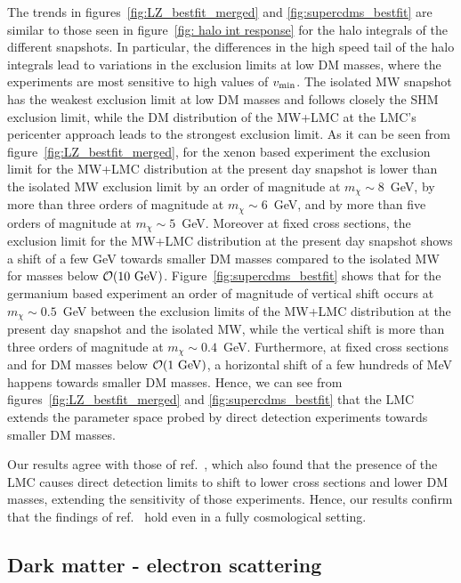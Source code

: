 The trends in figures~\ref{fig:LZ_bestfit_merged} and \ref{fig:supercdms_bestfit} are similar to those seen in figure~\ref{fig: halo int response} for the halo integrals of the different snapshots. In particular, the differences in the high speed tail of the halo integrals lead to variations in the exclusion limits at low DM masses, where the experiments are most sensitive to high values of $v_{\rm min}$. The isolated MW snapshot has the weakest exclusion limit at low DM masses and follows closely the SHM exclusion limit, while the DM distribution of the MW+LMC  at the LMC's pericenter approach leads to the strongest exclusion limit. As it can be seen from figure~\ref{fig:LZ_bestfit_merged}, for the xenon based experiment the exclusion limit for the MW+LMC distribution at the present day snapshot is lower than the isolated MW exclusion limit by an order of magnitude at $m_\chi \sim 8$~GeV, by more than three orders of magnitude  at $m_\chi \sim 6$~GeV, and by more than five orders of magnitude  at $m_\chi \sim 5$~GeV. Moreover at fixed cross sections, the exclusion limit for the MW+LMC distribution at the present day snapshot shows a shift of a few GeV towards smaller DM masses compared to the isolated MW for masses below $\mathcal{O}(10~{\rm GeV})$. Figure~\ref{fig:supercdms_bestfit} shows that for the germanium based experiment an order of magnitude  of vertical shift  occurs at $m_\chi \sim 0.5$~GeV between the exclusion limits of the MW+LMC distribution at the present day snapshot and the isolated MW, while the vertical shift is more than three orders of magnitude at  $m_\chi \sim 0.4$~GeV. Furthermore, at fixed cross sections and for DM masses below $\mathcal{O}(1~{\rm GeV})$, 
a horizontal shift of a few hundreds of MeV happens towards smaller DM masses. Hence, we can see from figures~\ref{fig:LZ_bestfit_merged} and \ref{fig:supercdms_bestfit} that the LMC extends the parameter space probed by direct detection experiments towards smaller DM masses.

Our results agree with those of ref.~\cite{Besla:2019xbx}, which also found that the presence of the LMC causes direct detection limits to shift to lower cross sections and lower DM masses, extending the sensitivity of those experiments. Hence, our results confirm that the findings of ref.~\cite{Besla:2019xbx} hold even in a fully cosmological setting. 



\subsection{Dark matter - electron scattering}
\label{sec: electron}

